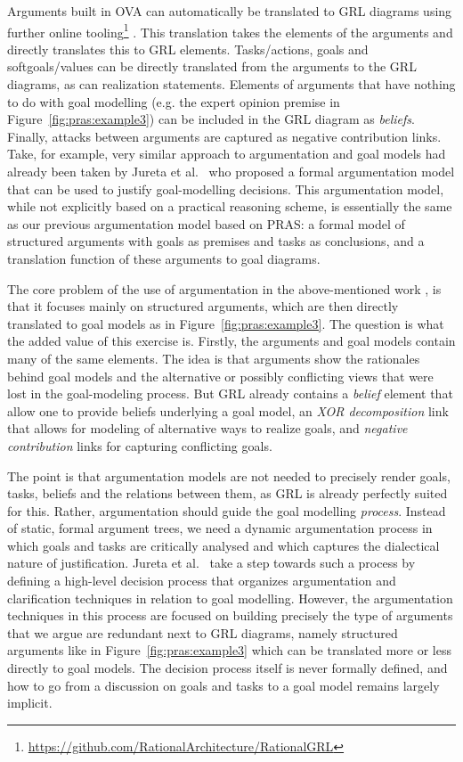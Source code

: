 \documentclass[11.5pt,two column]{llncs}
\newcommand\todo[4][]{%
	\ifthenelse{\equal{#1}{resolved}}{%
	}{%
		{\bf\color{red}TODO for #3\textcolor{gray}{(by #2)}: #4}%
	}%
}
\begin{document}
Arguments built in OVA can automatically be translated to GRL diagrams using further online tooling\footnote{\url{https://github.com/RationalArchitecture/RationalGRL}} \cite{vanZee-etal:comma2016}. This translation takes the elements of the arguments and directly translates this to GRL elements. Tasks/actions, goals and softgoals/values can be directly translated from the arguments to the GRL diagrams, as can realization statements. Elements of arguments that have nothing to do with goal modelling (e.g. the expert opinion premise in Figure~\ref{fig:pras:example3}) can be included in the GRL diagram as \emph{beliefs}. Finally, attacks between arguments are captured as negative contribution links. Take, for example, \todo{example}. A very similar approach to argumentation and goal models had already been taken by Jureta et al.~\cite{Jureta:RE2008} who proposed a formal argumentation model that can be used to justify goal-modelling decisions. This argumentation model, while not explicitly based on a practical reasoning scheme, is essentially the same as our previous argumentation model based on PRAS: a formal model of structured arguments with goals as premises and tasks as conclusions, and a translation function of these arguments to goal diagrams. 

The core problem of the use of argumentation in the above-mentioned work \cite{Jureta:RE2008,vanzee-etal:renext2015,vanZee-etal:er2016}, is that it focuses mainly on structured arguments, which are then directly translated to goal models as in Figure~\ref{fig:pras:example3}. The question is what the added value of this exercise is. Firstly, the arguments and goal models contain many of the same elements. The idea is that arguments show the rationales behind goal models and the alternative or possibly conflicting views that were lost in the goal-modeling process. But GRL already contains a \emph{belief} element that allow one to provide beliefs underlying a goal model, an \emph{XOR decomposition} link that allows for modeling of alternative ways to realize goals, and \emph{negative contribution} links for capturing conflicting goals. 

The point is that argumentation models are not needed to precisely render goals, tasks, beliefs and the relations between them, as GRL is already perfectly suited for this. Rather, argumentation should guide the goal modelling \emph{process}. Instead of static, formal argument trees, we need a dynamic argumentation process in which goals and tasks are critically analysed and which captures the dialectical nature of justification. Jureta et al.~\cite{Jureta:RE2008} take a step towards such a process by defining a high-level decision process that organizes argumentation and clarification techniques in relation to goal modelling. However, the argumentation techniques in this process are focused on building precisely the type of arguments that we argue are redundant next to GRL diagrams, namely structured arguments like in Figure~\ref{fig:pras:example3} which can be translated more or less directly to goal models. The decision process itself is never formally defined, and how to go from a discussion on goals and tasks to a goal model remains largely implicit. 
\end{document}
